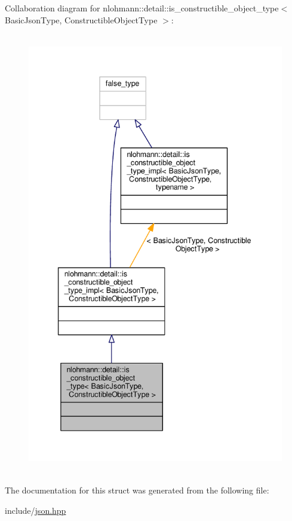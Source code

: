 Collaboration diagram for nlohmann\+:\+:detail\+:\+:is\+\_\+constructible\+\_\+object\+\_\+type$<$ Basic\+Json\+Type, Constructible\+Object\+Type $>$\+:
\nopagebreak
\begin{figure}[H]
\begin{center}
\leavevmode
\includegraphics[height=550pt]{structnlohmann_1_1detail_1_1is__constructible__object__type__coll__graph}
\end{center}
\end{figure}


The documentation for this struct was generated from the following file\+:\begin{DoxyCompactItemize}
\item 
include/\hyperlink{json_8hpp}{json.\+hpp}\end{DoxyCompactItemize}
